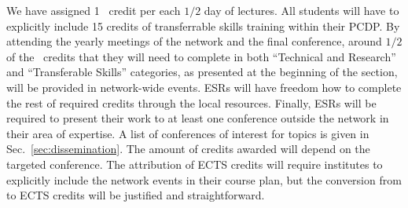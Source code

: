 We have assigned 1 \acronym\ credit per each $1/2$ day of lectures. 
All students will have to explicitly include 15 credits of transferrable skills training within their PCDP. 
By attending the yearly meetings of the network and the final conference, around $1/2$ of the \acronym\ credits that they will need to complete in both ``Technical and Research'' and ``Transferable Skills'' categories, as presented at the beginning of the section, will be provided in network-wide events. 
ESRs will have freedom how to complete the rest of required credits through the local resources. 
Finally, ESRs will be required to present their work to at least one conference outside the network in their area of expertise. 
A list of conferences of interest for \acronym topics is given in Sec.~\ref{sec:dissemination}.
The amount of credits awarded will depend on the targeted conference.  
The attribution of ECTS credits will require institutes to explicitly include the network events in their course plan, but the conversion from \acronym to ECTS credits will be justified and straightforward. 



